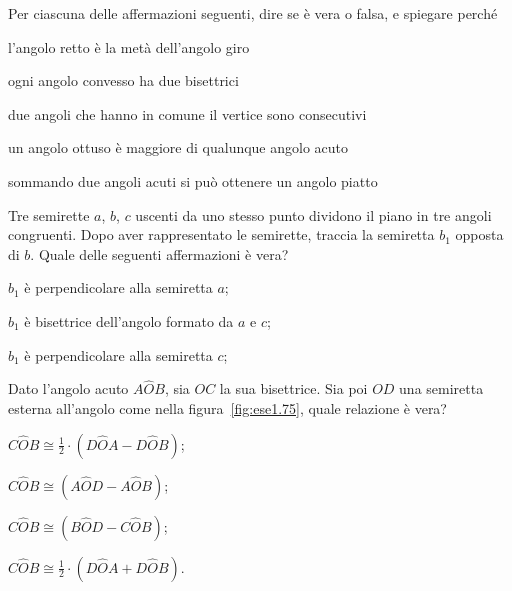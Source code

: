 \begin{esercizio}
\label{ese:1.73}
Per ciascuna delle affermazioni seguenti, dire se è vera o falsa, e spiegare perché
\begin{enumeratea}
\item l'angolo retto è la metà dell'angolo giro	\tab\tab\tab\qquad\boxV\quad\boxF
\item ogni angolo convesso ha due bisettrici		\tab\tab\tab\qquad\boxV\quad\boxF
\item due angoli che hanno in comune il vertice sono consecutivi	\tab\qquad\boxV\quad\boxF
\item un angolo ottuso è maggiore di qualunque angolo acuto		\tab\qquad\boxV\quad\boxF
\item sommando due angoli acuti si può ottenere un angolo piatto	\tab\qquad\boxV\quad\boxF
\end{enumeratea}
\end{esercizio}

\begin{esercizio}
\label{ese:1.74}
Tre semirette $a$, $b$, $c$ uscenti da uno stesso punto dividono il piano in tre angoli congruenti. Dopo aver rappresentato le semirette, traccia la semiretta $b_1$ opposta di $b$. Quale delle seguenti affermazioni è vera?
\begin{enumeratea}
\item $b_1$ è perpendicolare alla semiretta $a$;
\item $b_1$ è bisettrice dell'angolo formato da $a$ e $c$;
\item $b_1$ è perpendicolare alla semiretta $c$;
\end{enumeratea}
\end{esercizio}

\begin{esercizio}
\label{ese:1.75}
Dato l'angolo acuto $A\widehat{O}B$, sia $OC$ la sua bisettrice. Sia poi $OD$ una semiretta esterna all'angolo come nella figura~\ref{fig:ese1.75}, quale relazione è vera?
\begin{multicols}{2}
\begin{enumeratea}
\item $C\widehat{O}B\cong \frac{1}{2}\cdot(D\widehat{O}A-D\widehat{O}B)$;
\item $C\widehat{O}B\cong (A\widehat{O}D-A\widehat{O}B)$;
\item $C\widehat{O}B\cong (B\widehat{O}D-C\widehat{O}B)$;
\item $C\widehat{O}B\cong \frac{1}{2}\cdot(D\widehat{O}A+D\widehat{O}B)$.
\end{enumeratea}
\end{multicols}
\end{esercizio}

